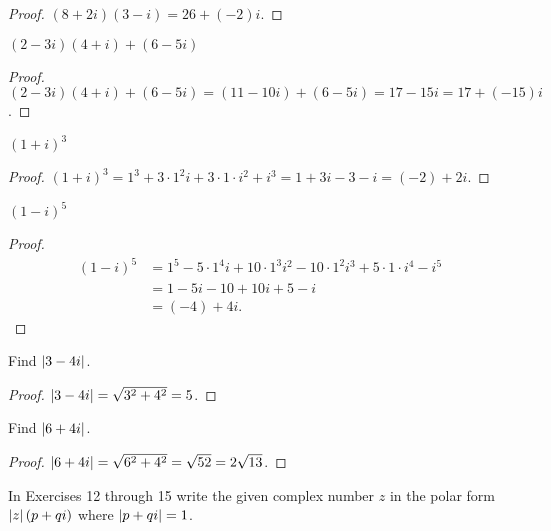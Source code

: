 \begin{proof}
    $(8 + 2i)(3 - i) = 26 + (-2)i$.
\end{proof}

\begin{exercise}
    $(2 - 3i)(4 + i) + (6 - 5i)$
\end{exercise}

\begin{proof}
    $(2 - 3i)(4 + i) + (6 - 5i) = (11 - 10i) + (6 - 5i) = 17 - 15i = 17 + (-15)i$.
\end{proof}

\begin{exercise}
    ${(1+i)}^{3}$
\end{exercise}

\begin{proof}
    ${(1+i)}^{3} = 1^{3} + 3\cdot 1^{2}i + 3\cdot 1\cdot i^{2} + i^{3} = 1 + 3i - 3 - i = (-2) + 2i$.
\end{proof}

\begin{exercise}
    ${(1-i)}^{5}$
\end{exercise}

\begin{proof}
    \begin{align*}
        {(1-i)}^{5} & = 1^{5} - 5\cdot 1^{4}i + 10\cdot 1^{3}i^{2} - 10\cdot 1^{2}i^{3} + 5\cdot 1\cdot i^{4} - i^{5} \\
                    & = 1 - 5i - 10 + 10i + 5 - i                                                                     \\
                    & = (-4) + 4i.
    \end{align*}
\end{proof}

\begin{exercise}
    Find $\left\vert{3 - 4i}\right\vert$.
\end{exercise}

\begin{proof}
    $\left\vert{3 - 4i}\right\vert = \sqrt{3^{2} + 4^{2}} = 5$.
\end{proof}

\begin{exercise}
    Find $\left\vert{6 + 4i}\right\vert$.
\end{exercise}

\begin{proof}
    $\left\vert{6 + 4i}\right\vert = \sqrt{6^{2} + 4^{2}} = \sqrt{52} = 2\sqrt{13}$.
\end{proof}

In Exercises 12 through 15 write the given complex number $z$ in the polar form $\left\vert{z}\right\vert(p + qi)$ where $\left\vert{p + qi}\right\vert = 1$.

